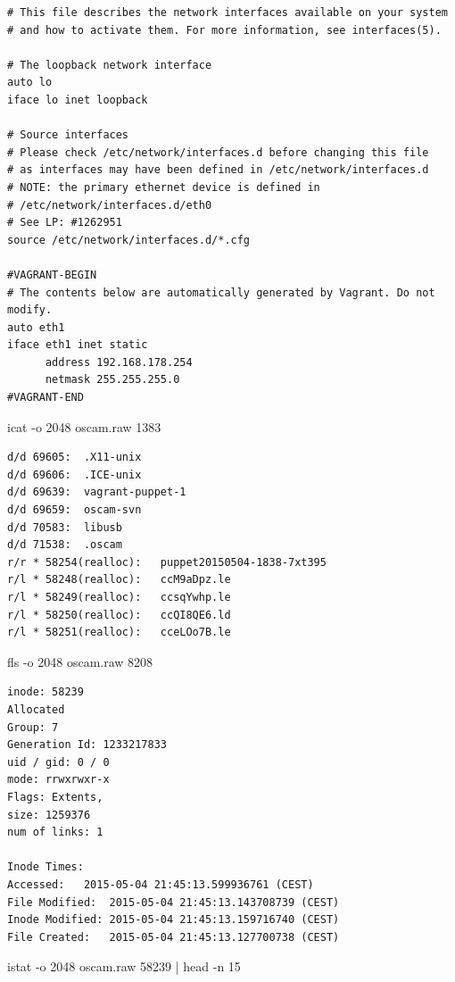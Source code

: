 \begin{cmd}[H]
\begin{verbatim}
# This file describes the network interfaces available on your system
# and how to activate them. For more information, see interfaces(5).

# The loopback network interface
auto lo
iface lo inet loopback

# Source interfaces
# Please check /etc/network/interfaces.d before changing this file
# as interfaces may have been defined in /etc/network/interfaces.d
# NOTE: the primary ethernet device is defined in
# /etc/network/interfaces.d/eth0
# See LP: #1262951
source /etc/network/interfaces.d/*.cfg

#VAGRANT-BEGIN
# The contents below are automatically generated by Vagrant. Do not modify.
auto eth1
iface eth1 inet static
      address 192.168.178.254
      netmask 255.255.255.0
#VAGRANT-END
\end{verbatim}
\caption{icat -o 2048 oscam.raw 1383}
\label{cmd:oscam-interfaces}
\end{cmd}

\begin{cmd}[H]
\begin{verbatim}
d/d 69605:	.X11-unix
d/d 69606:	.ICE-unix
d/d 69639:	vagrant-puppet-1
d/d 69659:	oscam-svn
d/d 70583:	libusb
d/d 71538:	.oscam
r/r * 58254(realloc):	puppet20150504-1838-7xt395
r/l * 58248(realloc):	ccM9aDpz.le
r/l * 58249(realloc):	ccsqYwhp.le
r/l * 58250(realloc):	ccQI8QE6.ld
r/l * 58251(realloc):	cceLOo7B.le
\end{verbatim}
\caption{fls -o 2048 oscam.raw 8208}
\label{cmd:oscam-tmp}
\end{cmd}

\begin{cmd}[H]
\begin{verbatim}
inode: 58239
Allocated
Group: 7
Generation Id: 1233217833
uid / gid: 0 / 0
mode: rrwxrwxr-x
Flags: Extents,
size: 1259376
num of links: 1

Inode Times:
Accessed:	2015-05-04 21:45:13.599936761 (CEST)
File Modified:	2015-05-04 21:45:13.143708739 (CEST)
Inode Modified:	2015-05-04 21:45:13.159716740 (CEST)
File Created:	2015-05-04 21:45:13.127700738 (CEST)
\end{verbatim}
\caption{istat -o 2048 oscam.raw 58239 | head -n 15}
\label{cmd:oscam-bin}
\end{cmd}

